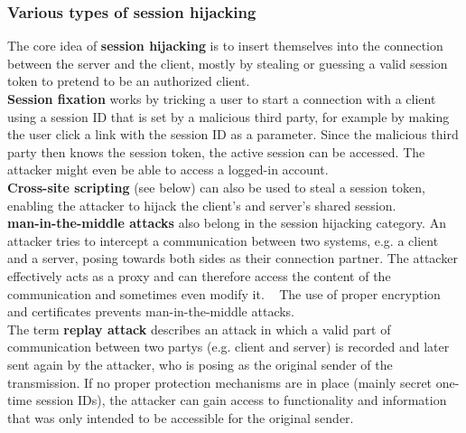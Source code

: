 \documentclass[
a4paper,
pagesize,
pdftex,
12pt,
twoside, %
BCOR=5mm, %
ngerman,
fleqn,
final,
]{scrartcl}
\begin{document}
	
	\subsubsection{Various types of session hijacking}
	The core idea of \textbf{session hijacking} is to insert themselves into the connection between the server and the client, mostly by stealing or guessing a valid session token to pretend to be an authorized client.~\cite{OWASPFoundation.14.8.2014}\\
	\textbf{Session fixation} works by tricking a user to start a connection with a client using a session ID that is set by a malicious third party, for example by making the user click a link with the session ID as a parameter. Since the malicious third party then knows the session token, the active session can be accessed. The attacker might even be able to access a logged-in account.
	~\cite{OWASPFoundation.14.8.2014}\\
	\textbf{Cross-site scripting} (see below) can also be used to steal a session token, enabling the attacker to hijack the client's and server's shared session.\\
	\textbf{man-in-the-middle attacks} also belong in the session hijacking category. An attacker tries to intercept a communication between two systems, e.g. a client and a server, posing towards both sides as their connection partner. The attacker effectively acts as a proxy and can therefore access the content of the communication and sometimes even modify it. ~\cite{OWASPFoundation.31.8.2015} The use of proper encryption and certificates prevents man-in-the-middle attacks.\\
	The term \textbf{replay attack} describes an attack in which a valid part of communication between two partys (e.g. client and server) is recorded and later sent again by the attacker, who is posing as the original sender of the transmission. If no proper protection mechanisms are in place (mainly secret one-time session IDs), the attacker can gain access to functionality and information that was only intended to be accessible for the original sender.
	
\end{document}
